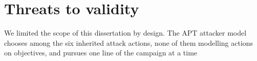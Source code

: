 \documentclass{cshonours}
\begin{document}
\section{Threats to validity}
\label{sec:threats}
We limited the scope of this dissertation by design. The APT attacker model
chooses among the six inherited attack actions, none of them modelling actions
on objectives, and pursues one line of the campaign at a time
\end{document}
